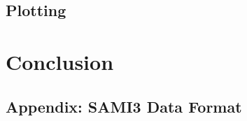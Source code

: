 \documentclass[12pt,letterpaper]{article}
\begin{document}
\subsection{Plotting}
\label{sec:design:plotting}

%
%
\section{Conclusion}
\label{sec:conclusion}

%
%
\newpage
\renewcommand{\bibname}{References}



\newpage
\begin{appendices}
  
  \section{Appendix: SAMI3 Data Format}
  \label{sec:sami3_df}

\end{appendices}
\end{document}
